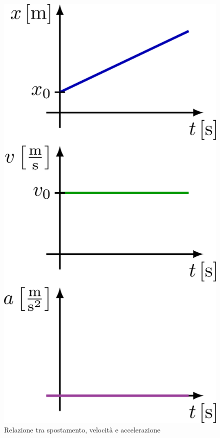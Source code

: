 \begin{figure}[H]
\begin{minipage}[c]{0.40\textwidth}
\includegraphics[width=1\textwidth]{image/motoUniforme.png}
\caption{Relazione tra spostamento, velocità e accelerazione}
\label{img:TIKZmotorettuniforme}
\end{minipage}
\end{figure}


